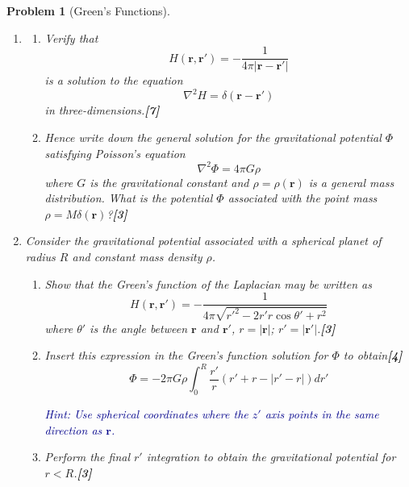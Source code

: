 \documentclass[a4paper]{article}
\theoremstyle{new}
\newtheorem{qns}{Problem}[section]
\begin{document}
\begin{qns}[Green's Functions]
\leavevmode
\begin{enumerate}[label=(\roman*)]
\item 
\begin{enumerate}[label=(\alph*)]
\item Verify that
$$H(\mathbf{r},\mathbf{r'})=-\frac{1}{4\pi|\mathbf{r}-\mathbf{r'}|}$$
is a solution to the equation
$$\nabla^2H=\delta(\mathbf{r}-\mathbf{r'})$$
in three-dimensions.\hfill\textbf{[7]}
\item Hence write down the general solution for the gravitational potential $\Phi$ satisfying Poisson’s equation
$$\nabla^2\Phi=4\pi G\rho$$
where $G$ is the gravitational constant and $\rho=\rho(\mathbf{r})$ is a general mass distribution. What is the potential $\Phi$ associated with the point mass $\rho=M\delta(\mathbf{r})$?\hfill\textbf{[3]}
\end{enumerate}
\item Consider the gravitational potential associated with a spherical planet of radius $R$ and constant mass density $\rho$.
\begin{enumerate}[label=(\alph*)]
\item Show that the Green’s function of the Laplacian may be written as
$$H(\mathbf{r},\mathbf{r'})=-\frac{1}{4\pi\sqrt{r'^2-2r'r\cos\theta'+r^2}}$$
where $\theta'$ is the angle between $\mathbf{r}$ and $\mathbf{r'}$, $r = |\mathbf{r}|$; $r' = |\mathbf{r'}|$.\hfill\textbf{[3]}
\item Insert this expression in the Green’s function solution for $\Phi$ to obtain\hfill\textbf{[4]}
$$\Phi=-2\pi G\rho\int_0^R\frac{r'}{r}(r'+r-|r'-r|)dr'$$
\begin{mdframed}
\textcolor{darkblue}{Hint: Use spherical coordinates where the $z'$ axis points in the same direction as $\mathbf{r}$.}
\end{mdframed}
\item Perform the final $r'$ integration to obtain the gravitational potential for $r < R$.\hfill\textbf{[3]}
\end{enumerate}
\end{enumerate}
\end{qns}
\end{document}
